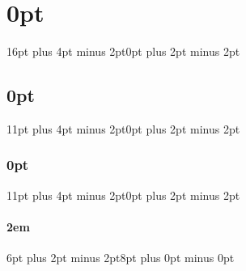 \usepackage{titlesec} %

\titlespacing\section{0pt}{16pt plus 4pt minus 2pt}{0pt plus 2pt minus 2pt}
\titlespacing\subsection{0pt}{11pt plus 4pt minus 2pt}{0pt plus 2pt minus 2pt}
\titlespacing\subsubsection{0pt}{11pt plus 4pt minus 2pt}{0pt plus 2pt minus 2pt}
\titlespacing\paragraph{2em}{6pt plus 2pt minus 2pt}{8pt plus 0pt minus 0pt}
\newcommand{\sectionbreak}{\clearpage} %



\usepackage{pbox}
\usepackage{array}%



\usepackage{multicol}


\usepackage[bottom]{footmisc}
\newcommand{\astfootnote}[1]{
	\let\oldthefootnote=\thefootnote
	\setcounter{footnote}{0}
	\renewcommand{\thefootnote}{\fnsymbol{footnote}}
	\hspace*{-.45cm}\footnote{#1}\unskip
	\let\thefootnote=\oldthefootnote
}



